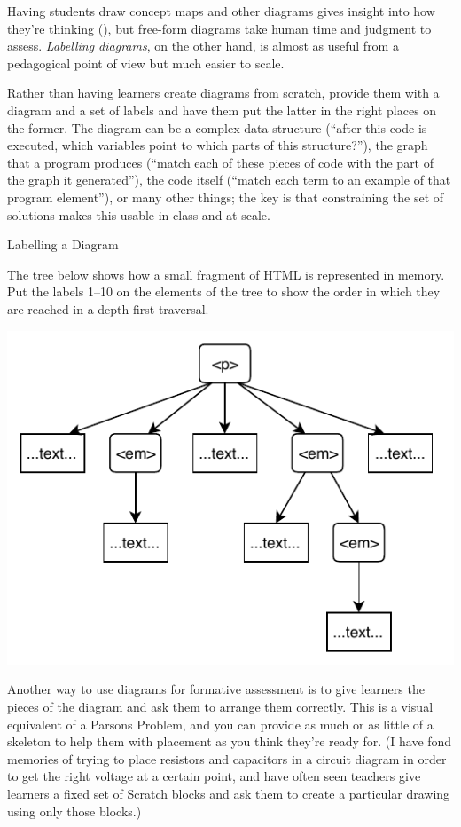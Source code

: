 Having students draw concept maps and other diagrams gives insight
into how they're thinking (), but
free-form diagrams take human time and judgment to assess.
\emph{Labelling diagrams}, on the other hand, is almost as useful from
a pedagogical point of view but much easier to scale.

Rather than having learners create diagrams from scratch, provide them
with a diagram and a set of labels and have them put the latter in the
right places on the former.  The diagram can be a complex data
structure (``after this code is executed, which variables point to
which parts of this structure?''), the graph that a program produces
(``match each of these pieces of code with the part of the graph it
generated''), the code itself (``match each term to an example of that
program element''), or many other things; the key is that constraining
the set of solutions makes this usable in class and at scale.

\begin{callout}{Labelling a Diagram}

  The tree below shows how a small fragment of HTML is represented in
  memory.  Put the labels 1--10 on the elements of the tree to show
  the order in which they are reached in a depth-first traversal.

  {\centering
    \includegraphics{../docs/fig/labelling.pdf}
  }

\end{callout}

Another way to use diagrams for formative assessment is to give
learners the pieces of the diagram and ask them to arrange them
correctly.  This is a visual equivalent of a Parsons Problem, and you
can provide as much or as little of a skeleton to help them with
placement as you think they're ready for.  (I have fond memories
of trying to place resistors and capacitors in a circuit diagram
in order to get the right voltage at a certain point, and have often
seen teachers give learners a fixed set of Scratch blocks and ask them
to create a particular drawing using only those blocks.)

